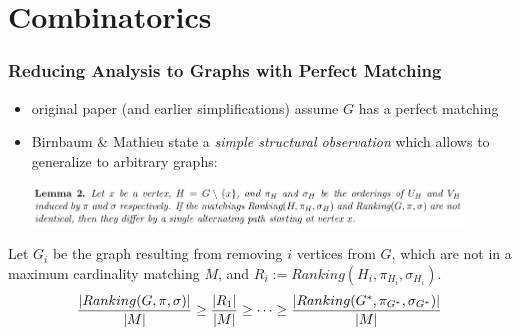 \documentclass{beamer}
\DeclarePairedDelimiter\card{\lvert}{\rvert}
\begin{document}
\section{Combinatorics}

\begin{frame}
  \frametitle{Reducing Analysis to Graphs with Perfect Matching}
  \begin{itemize}[<+->]
    \item original paper (and earlier simplifications) assume $G$ has a perfect matching
    \item Birnbaum \& Mathieu state a \alert{\emph{simple structural observation}} which allows to
      generalize to arbitrary graphs:
      
      \vspace{1em}
      \includegraphics[width=0.9\textwidth]{figures/lemma2}
  \end{itemize}
  Let $G_i$ be the graph resulting from removing $i$ vertices from $G$, which are not in a maximum cardinality matching $M$, and
  $R_i := Ranking(H_i, \pi_{H_i}, \sigma_{H_i})$.
  \[
    \frac{\card{Ranking(G,\pi,\sigma)}}{\card{M}} \geq \frac{{\card{R_1}}}{\card{M}} \geq \dots 
    \geq \frac{{\card{Ranking(G^*, \pi_{G^*}, \sigma_{G^*})}}}{\card{M}}
  \]
\end{frame}
\end{document}
